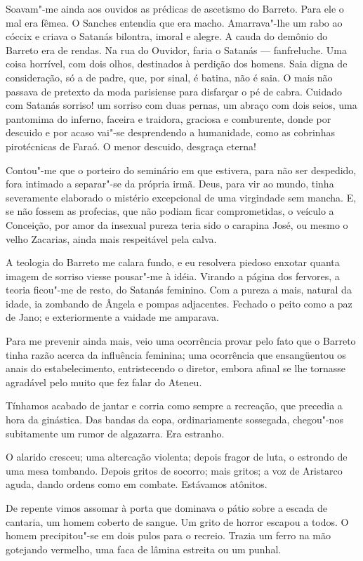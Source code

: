 Soavam"-me ainda aos ouvidos as prédicas de
ascetismo do Barreto. Para ele o mal era fêmea. O Sanches entendia que
era macho. Amarrava"-lhe um rabo ao cóccix e criava o Satanás
bilontra, imoral e alegre. A cauda do demônio do Barreto era de rendas.
Na rua do Ouvidor, faria o Satanás --- fanfreluche. Uma coisa horrível, com
dois olhos, destinados à perdição dos homens. Saia digna de
consideração, só a de padre, que, por sinal, é batina, não é saia. O
mais não passava de pretexto da moda parisiense para disfarçar o pé de
cabra. Cuidado com Satanás sorriso! um sorriso com duas pernas, um
abraço com dois seios, uma pantomima do inferno, faceira e traidora,
graciosa e comburente, donde por descuido e por acaso vai"-se
desprendendo a humanidade, como as cobrinhas pirotécnicas de Faraó. O
menor descuido, desgraça eterna! 

Contou"-me que o porteiro do
seminário em que estivera, para não ser despedido, fora intimado a
separar"-se da própria irmã. Deus, para vir ao mundo, tinha
severamente elaborado o mistério excepcional de uma virgindade sem
mancha. E, se não fossem as profecias, que não podiam ficar
comprometidas, o veículo a Conceição, por amor da insexual pureza teria
sido o carapina José, ou mesmo o velho Zacarias, ainda mais respeitável
pela calva. 

A teologia do Barreto me calara fundo, e eu resolvera
piedoso enxotar quanta imagem de sorriso viesse pousar"-me à idéia.
Virando a página dos fervores, a teoria ficou"-me de resto, do Satanás
feminino. Com a pureza a mais, natural da idade, ia zombando de Ângela
e pompas adjacentes. Fechado o peito como a paz de Jano; e
exteriormente a vaidade me amparava. 

Para me prevenir ainda mais, veio
uma ocorrência provar pelo fato que o Barreto tinha razão acerca da
influência feminina; uma ocorrência que ensangüentou os anais do
estabelecimento, entristecendo o diretor, embora afinal se lhe tornasse
agradável pelo muito que fez falar do Ateneu. 

Tínhamos acabado de
jantar e corria como sempre a recreação, que precedia a hora da
ginástica. Das bandas da copa, ordinariamente sossegada, chegou"-nos
subitamente um rumor de algazarra. Era estranho. 

O alarido cresceu; uma
altercação violenta; depois fragor de luta, o estrondo de uma mesa
tombando. Depois gritos de socorro; mais gritos; a voz de Aristarco
aguda, dando ordens como em combate. Estávamos atônitos. 

De repente vimos assomar à porta que dominava o pátio sobre a escada de cantaria,
um homem coberto de sangue. Um grito de horror escapou a todos. O homem
precipitou"-se em dois pulos para o recreio. Trazia um ferro na mão
gotejando vermelho, uma faca de lâmina estreita ou um punhal. 

